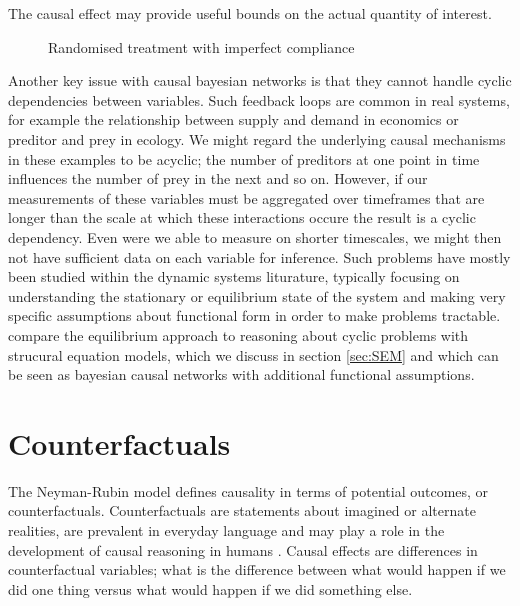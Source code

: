 \documentclass[11pt,a4paper,oneside]{book}
\theoremstyle{plain}
\theoremstyle{definition}
\begin{document}
The causal effect may provide useful bounds on the actual quantity of interest. 

\begin{figure}[h]
\caption{Randomised treatment with imperfect compliance}
\label{fig:randomized_imperfect_compliance}
\centering
{}
\end{figure}

Another key issue with causal bayesian networks is that they cannot handle cyclic dependencies between variables. Such feedback loops are common in real systems, for example the relationship between supply and demand in economics or preditor and prey in ecology. We might regard the underlying causal mechanisms in these examples to be acyclic; the number of preditors at one point in time influences the number of prey in the next and so on. However, if our measurements of these variables must be aggregated over timeframes that are longer than the scale at which these interactions occure the result is a cyclic dependency. Even were we able to measure on shorter timescales, we might then not have sufficient data on each variable for inference. Such problems have mostly been studied within the dynamic systems liturature, typically focusing on understanding the stationary or equilibrium state of the system and making very specific assumptions about functional form in order to make problems tractable. \citep{Poole2013} compare the equilibrium approach to reasoning about cyclic problems with strucural equation models, which we discuss in section \ref{sec:SEM} and which can be seen as bayesian causal networks with additional functional assumptions. 

\section{Counterfactuals}

The Neyman-Rubin model \cite{Rubin1974,Rubin1978,Rosenbaum1983, Rubin2005,Rubin2008} defines causality in terms of potential outcomes, or counterfactuals. Counterfactuals are statements about imagined or alternate realities, are prevalent in everyday language and may play a role in the development of causal reasoning in humans \cite{Weisberg2013}. Causal effects are differences in counterfactual variables; what is the difference between what would happen if we did one thing versus what would happen if we did something else. 
\end{document}
